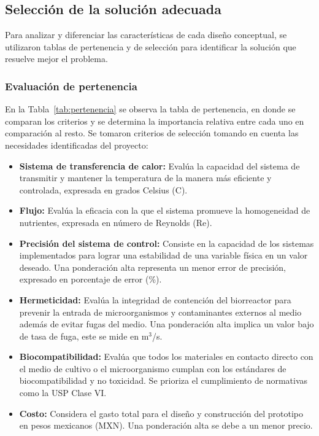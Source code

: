 \subsection{Selección de la solución adecuada}

Para analizar y diferenciar las características de cada diseño conceptual, se
utilizaron tablas de pertenencia y de selección para identificar la solución que
resuelve mejor el problema.

\subsubsection{Evaluación de pertenencia}

En la Tabla~\ref{tab:pertenencia} se observa la tabla de pertenencia, en donde se comparan los criterios
y se determina la importancia relativa entre cada uno en comparación al resto. Se
tomaron criterios de selección tomando en cuenta las necesidades identificadas del
proyecto:

\begin{itemize}
  \item \textbf{Sistema de transferencia de calor:} Evalúa la capacidad del sistema de transmitir y mantener la temperatura de la manera más eficiente y controlada, expresada en grados Celsius (\textdegree C).
  \item \textbf{Flujo:} Evalúa la eficacia con la que el sistema promueve la homogeneidad de nutrientes, expresada en número de Reynolds (Re).
  \item \textbf{Precisión del sistema de control:} Consiste en la capacidad de los sistemas implementados para lograr una estabilidad de una variable física en un valor deseado. Una ponderación alta representa un menor error de precisión, expresado en porcentaje de error (\%).
  \item \textbf{Hermeticidad:} Evalúa la integridad de contención del biorreactor para prevenir la entrada de microorganismos y contaminantes externos al medio además de evitar fugas del medio. Una ponderación alta implica un valor bajo de tasa de fuga, este se mide en m$^3$/s.
  \item \textbf{Biocompatibilidad:} Evalúa que todos los materiales en contacto directo con el medio de cultivo o el microorganismo cumplan con los estándares de biocompatibilidad y no toxicidad. Se prioriza el cumplimiento de normativas como la USP Clase VI.
  \item \textbf{Costo:} Considera el gasto total para el diseño y construcción del prototipo en pesos mexicanos (MXN). Una ponderación alta se debe a un menor precio.
\end{itemize}

